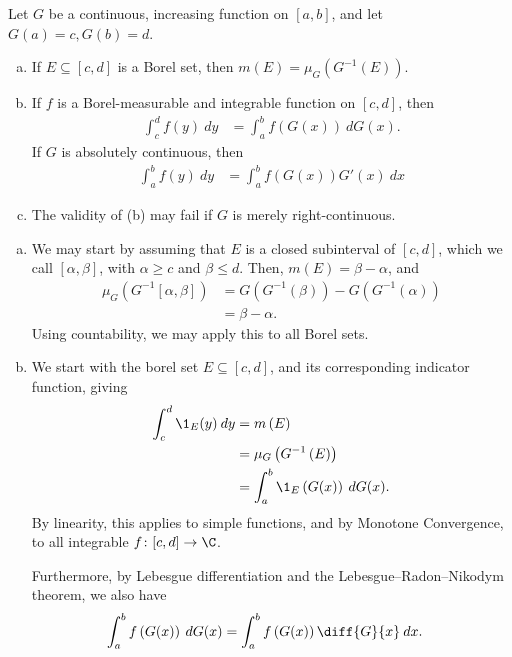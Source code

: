 \documentclass[10pt]{mypackage}
\begin{document}
\begin{exercise}[Exercise 36]
  Let $G$ be a continuous, increasing function on $\left[ a,b \right]$, and let $G(a)=c,G(b)=d$.
  \begin{enumerate}[(a)]
    \item If $E\subseteq \left[ c,d \right]$ is a Borel set, then $m\left( E \right) = \mu_G\left( G^{-1}(E) \right)$.
    \item If $f$ is a Borel-measurable and integrable function on $\left[ c,d \right]$, then 
      \begin{align*}
        \int_{c}^{d} f(y)\:dy &= \int_{a}^{b} f\left( G(x) \right)\:dG(x).
      \end{align*}
      If $G$ is absolutely continuous, then
      \begin{align*}
        \int_{a}^{b} f(y)\:dy &= \int_{a}^{b} f\left( G(x) \right)G'(x)\:dx
      \end{align*}
    \item The validity of (b) may fail if $G$ is merely right-continuous.
  \end{enumerate}
\end{exercise}
\begin{solution}\hfill
  \begin{enumerate}[(a)]
    \item We may start by assuming that $E$ is a closed subinterval of $\left[ c,d \right]$, which we call $\left[ \alpha,\beta \right]$, with $\alpha \geq c$ and $\beta \leq d$. Then, $m\left( E \right) = \beta-\alpha$, and 
      \begin{align*}
        \mu_G\left( G^{-1}\left[ \alpha,\beta \right] \right) &= G\left( G^{-1}\left( \beta \right) \right) - G\left( G^{-1}\left( \alpha \right) \right)\\
                                                              &= \beta-\alpha.
      \end{align*}
      Using countability, we may apply this to all Borel sets.
    \item We start with the borel set $E\subseteq [c,d]$, and its corresponding indicator function, giving
      \begin{align*}
        \int_{c}^{d} \1_E(y)\:dy &= m\left( E \right)\\
                                 &= \mu_G\left( G^{-1}\left( E \right) \right)\\
                                 &= \int_{a}^{b} \1_E\left( G(x) \right)\:dG(x).
      \end{align*}
      By linearity, this applies to simple functions, and by Monotone Convergence, to all integrable $f\colon [c,d]\rightarrow \C$.\newline

      Furthermore, by Lebesgue differentiation and the Lebesgue--Radon--Nikodym theorem, we also have
      \begin{align*}
        \int_{a}^{b} f\left( G(x) \right)\:dG(x) &= \int_{a}^{b} f\left( G(x) \right)\diff{G}{x}\:dx.
      \end{align*}
  \end{enumerate}
\end{solution}
\end{document}
